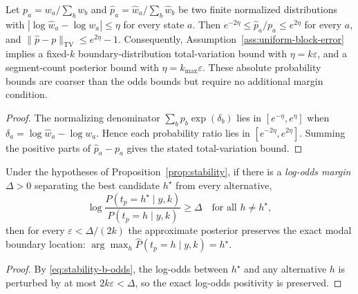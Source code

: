 \begin{corollary}
\label{cor:probability-error-conversion}
Let $p_a=w_a/\sum_b w_b$ and $\widehat p_a=\widehat w_a/\sum_b\widehat w_b$ be two
finite normalized distributions with $|\log\widehat w_a-\log w_a|\le\eta$ for every state $a$. Then
$e^{-2\eta}\le \widehat p_a/p_a\le e^{2\eta}$ for every $a$, and
$\|\widehat p-p\|_{\mathrm{TV}}\le e^{2\eta}-1$. Consequently, Assumption~\ref{ass:uniform-block-error}
implies a fixed-$k$ boundary-distribution total-variation bound with $\eta=k\varepsilon$, and a
segment-count posterior bound with $\eta=k_{\max}\varepsilon$. These absolute probability bounds are
coarser than the odds bounds but require no additional margin condition.
\end{corollary}

\begin{proof}
The normalizing denominator $\sum_b p_b\exp(\delta_b)$ lies in $[e^{-\eta},e^{\eta}]$ when
$\delta_a=\log\widehat w_a-\log w_a$. Hence each probability ratio lies in
$[e^{-2\eta},e^{2\eta}]$. Summing the positive parts of $\widehat p_a-p_a$ gives the stated total-variation bound.
\end{proof}

\begin{corollary}
\label{cor:ranking}
Under the hypotheses of Proposition~\ref{prop:stability}, if there is a \emph{log-odds margin}
$\Delta>0$ separating the best candidate $h^\star$ from every alternative,
\[
\log\frac{P(t_p=h^\star\mid y,k)}{P(t_p=h\mid y,k)}\ge \Delta
\quad\text{for all }h\ne h^\star,
\]
then for every $\varepsilon<\Delta/(2k)$ the approximate posterior preserves the exact modal
boundary location: $\arg\max_h \widehat P(t_p=h\mid y,k)=h^\star$.
\end{corollary}

\begin{proof}
By \eqref{eq:stability-b-odds}, the log-odds between $h^\star$ and any alternative $h$ is
perturbed by at most $2k\varepsilon<\Delta$, so the exact log-odds positivity is preserved.
\end{proof}


